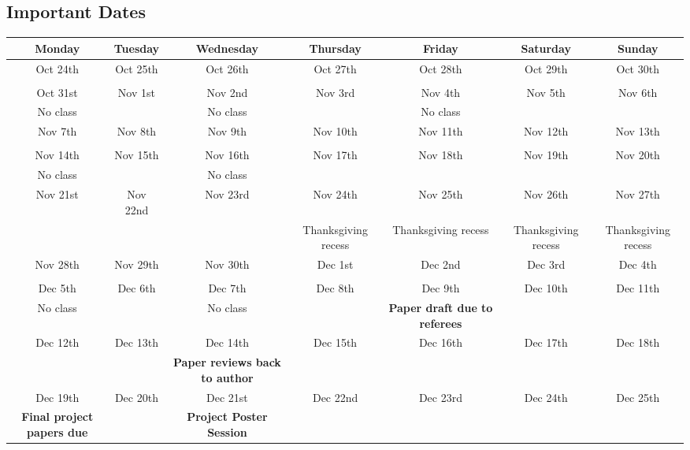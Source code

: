 \documentclass[10pt]{article}
\begin{document}
\subsection{Important Dates}
\begin{center}
	\begin{adjustbox}{width=1\textwidth}
	\def\arraystretch{1.5}
	\begin{tabular}{c |c |c |c | c | c | c}
		\hline
		Monday & Tuesday & Wednesday & Thursday & Friday & Saturday & Sunday \\
		\hline \hline
		Oct 24th & Oct 25th & Oct 26th & Oct 27th & Oct 28th & Oct 29th & Oct 30th \\ 
		 &  &  &  &  &  &  \\ \hline
		Oct 31st & Nov 1st & Nov 2nd & Nov 3rd & Nov 4th & Nov 5th & Nov 6th \\
		No class &  & No class &  & No class &  &  \\ \hline
		Nov 7th & Nov 8th & Nov 9th & Nov 10th & Nov 11th & Nov 12th & Nov 13th \\
		 &  &  &  &  &  &  \\ \hline
		Nov 14th & Nov 15th & Nov 16th & Nov 17th & Nov 18th & Nov 19th & Nov 20th \\ 
		No class &  & No class &  &  &  &  \\ \hline
		Nov 21st & Nov 22nd & Nov 23rd & Nov 24th & Nov 25th & Nov 26th & Nov 27th \\ 
		 &  &  & Thanksgiving recess & Thanksgiving recess & Thanksgiving recess & Thanksgiving recess \\ \hline
		Nov 28th & Nov 29th & Nov 30th & Dec 1st & Dec 2nd & Dec 3rd & Dec 4th \\ 
		 &  &  &  &  &  &  \\ \hline
		Dec 5th & Dec 6th & Dec 7th & Dec 8th & Dec 9th & Dec 10th & Dec 11th \\ 
		No class &  & No class&  & \textbf{Paper draft due to referees} &  &  \\ \hline
		Dec 12th & Dec 13th & Dec 14th & Dec 15th & Dec 16th & Dec 17th & Dec 18th \\ 
		 &  & \textbf{Paper reviews back to author} &  &  &  &  \\ \hline
		Dec 19th & Dec 20th & Dec 21st & Dec 22nd & Dec 23rd & Dec 24th & Dec 25th \\
		\textbf{Final project papers due} &  & \textbf{Project Poster Session} &  &  &  & \\ \hline
	\end{tabular}
	\end{adjustbox}
\end{center}
\end{document}
